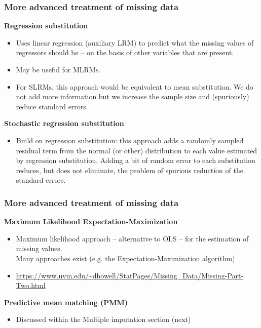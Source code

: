 \documentclass{beamer}
\begin{document}
\begin{frame}
\frametitle{More advanced treatment of missing data}
\textbf{Regression substitution}
  \begin{itemize}
  \item Uses linear regression (auxiliary LRM) to predict what the missing values of regressors should be -- on the basis of other variables that are present.
  \item May be useful for MLRMs.
  \item For SLRMs, this approach would be equivalent to mean substitution. We do not add more information but we increase the sample size and (spuriously) reduce standard errors.

   \end{itemize}
  \vspace{0.2cm}
\textbf{Stochastic regression substitution}
  \begin{itemize}
  \item Build on regression substitution: this approach adds a randomly sampled residual term from the normal (or other) distribution to each value estimated by regression substitution. Adding a bit of random error to each substitution reduces, but does not eliminate, the problem of spurious reduction of the standard errors.
   \end{itemize}
\end{frame}
\begin{frame}
\frametitle{More advanced treatment of missing data}

\textbf{Maximum Likelihood Expectation-Maximization}\\
\bigskip
  \begin{itemize}
  \item Maximum likelihood approach -- alternative to OLS -- for the estimation of missing values. \\ \medskip 
  Many approaches exist (e.g. the Expectation-Maximization algorithm)
  \item[] \scriptsize{\url{https://www.uvm.edu/~dhowell/StatPages/Missing_Data/Missing-Part-Two.html}}
   \end{itemize}
\bigskip   
 \textbf{Predictive mean matching (PMM)}\\
\begin{itemize}
     \item Discussed within the Multiple imputation section (next)
 \end{itemize}

\end{frame}
\end{document}
